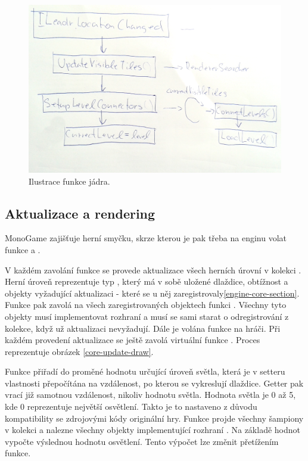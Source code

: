 \begin{figure}[H]\centering
\includegraphics[width=\textwidth]{./img/core-tileUpdate.png}
\caption{Ilustrace funkce jádra. }
\label{core-tileUpdate}
\end{figure}

\subsection{Aktualizace a rendering}
MonoGame zajišťuje herní smyčku, skrze kterou je pak třeba na enginu volat funkce  a .

V každém zavolání funkce  se provede aktualizace všech herních úrovní v kolekci .
Herní úroveň reprezentuje typ , který má v sobě uložené dlaždice, obtížnost a objekty vyžadující
aktualizaci - které se u něj zaregistrovaly\vref{engine-core-section}. Funkce  pak 
zavolá na všech zaregistrovaných objektech  funkci . Všechny tyto objekty musí implementovat
rozhraní  a musí se sami starat o odregistrování z kolekce, když už aktualizaci nevyžadují. Dále je volána 
funkce  na hráči. Při každém provedení aktualizace se ještě zavolá virtuální funkce 
. Proces reprezentuje obrázek \ref{core-update-draw}.

Funkce  přiřadí do proměné  hodnotu určující úroveň světla, která je v setteru
vlastnosti přepočítána na vzdálenost, po kterou se vykreslují dlaždice. Getter pak vrací již samotnou vzdálenost,
nikoliv hodnotu světla. Hodnota světla je 0 až 5, kde 0 reprezentuje největší osvětlení. Takto je to nastaveno
z důvodu kompatibility se zdrojovými kódy originální hry\cite{DMDecompilation}. 
 Funkce projde všechny šampiony v kolekci  a nalezne všechny 
objekty implementující rozhraní . Na základě hodnot  vypočte 
výslednou hodnotu osvětlení. Tento výpočet lze změnit přetížením funkce. 

